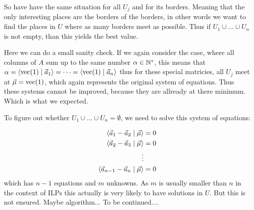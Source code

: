 So have have the same situation for all $U_j$ and for its borders. Meaning that the only interesting places are the borders of the borders, in other words we want to find the places in $U$ where as many borders meet as possible. Thus if $U_1 \cup \dots \cup U_n$ is not empty, than this yields the best value.

Here we can do a small sanity check. If we again consider the case, where all columns of $A$ sum up to the same number $\alpha \in \mathbb{N}^*$, this means that $\alpha = \langle \operatorname{vec}(1) \mid \vec a_1 \rangle = \dots = \langle \operatorname{vec}(1) \mid \vec a_n \rangle$ thus for these special matricies, all $U_j$ meet at $\vec \mu = \operatorname{vec}(1)$, which again represents the original system of equations. Thus these systems cannot be improved, because they are allready at there minimum. Which is what we expected.

To figure out whether $U_1 \cup \dots \cup U_n = \emptyset$, we need to solve this system of equations:

\begin{align*}
    \langle \vec a_1 - \vec a_2 \mid \vec \mu \rangle &= 0\\
    \langle \vec a_2 - \vec a_3 \mid \vec \mu \rangle &= 0\\
    \vdots & \\
    \langle \vec a_{n-1} - \vec a_{n} \mid \vec \mu \rangle &= 0
\end{align*}
which has $n-1$ equations and $m$ unknowns. As $m$ is usually smaller than $n$ in the context of ILPs this actually is very likely to have solutions in $U$. But this is not ensured. Maybe algorithm... To be continued....

